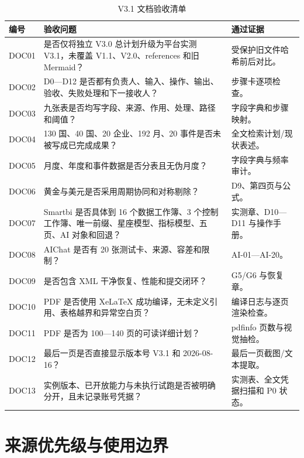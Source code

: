 \documentclass[UTF8,fontset=windows,12pt,openany]{ctexbook}
\begin{document}
\begin{longtable}{p{1.8cm}p{8.0cm}p{4.2cm}}
\caption{V3.1 文档验收清单}\label{tab:document-qa}\\
\toprule
\textbf{编号} & \textbf{验收问题} & \textbf{通过证据}\\
\midrule
DOC01 & 是否仅将独立 V3.0 总计划升级为平台实测 V3.1，未覆盖 V1.1、V2.0、references 和旧 Mermaid？ & 受保护旧文件哈希前后对比。\\
DOC02 & D0—D12 是否都有负责人、输入、操作、输出、验收、失败处理和下一接收人？ & 步骤卡逐项检查。\\
DOC03 & 九张表是否均写字段、来源、作用、处理、路径和阈值？ & 字段字典和步骤映射。\\
DOC04 & 130 国、40 国、20 企业、192 月、20 事件是否未被写成已完成成果？ & 全文检索计划/现状表述。\\
DOC05 & 月度、年度和事件数据是否分表且无伪月度？ & 字段字典与频率审计。\\
DOC06 & 黄金与美元是否采用周期协同和对称剔除？ & D9、第四页与公式。\\
DOC07 & Smartbi 是否具体到 16 个数据工作簿、3 个控制工作簿、唯一前缀、星座模型、指标模型、五页、AI 对象和回退？ & 实测章、D10—D11 与操作手册。\\
DOC08 & AIChat 是否有 20 张测试卡、来源、容差和限制？ & AI-01—AI-20。\\
DOC09 & 是否包含 XML 干净恢复、性能和提交闭环？ & G5/G6 与恢复章。\\
DOC10 & PDF 是否使用 XeLaTeX 成功编译，无未定义引用、表格越界和异常空白页？ & 编译日志与逐页渲染检查。\\
DOC11 & PDF 是否为 100—140 页的可读详细计划？ & pdfinfo 页数与视觉抽检。\\
DOC12 & 最后一页是否直接显示版本号 V3.1 和 2026-08-16？ & 最后一页截图/文本提取。\\
DOC13 & 实例版本、已开放能力与未执行试跑是否被明确分开，且未记录账号凭据？ & 实测表、全文凭据扫描和 P0 状态。\\
\bottomrule
\end{longtable}

\appendix

\chapter{来源优先级与使用边界}
\end{document}

